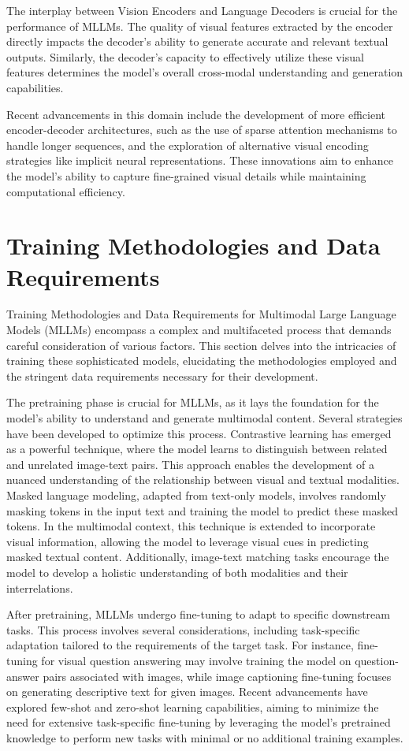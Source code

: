The interplay between Vision Encoders and Language Decoders is crucial for the performance of MLLMs. The quality of visual features extracted by the encoder directly impacts the decoder's ability to generate accurate and relevant textual outputs. Similarly, the decoder's capacity to effectively utilize these visual features determines the model's overall cross-modal understanding and generation capabilities.

Recent advancements in this domain include the development of more efficient encoder-decoder architectures, such as the use of sparse attention mechanisms to handle longer sequences, and the exploration of alternative visual encoding strategies like implicit neural representations. These innovations aim to enhance the model's ability to capture fine-grained visual details while maintaining computational efficiency.

\section{Training Methodologies and Data Requirements}
Training Methodologies and Data Requirements for Multimodal Large Language Models (MLLMs) encompass a complex and multifaceted process that demands careful consideration of various factors. This section delves into the intricacies of training these sophisticated models, elucidating the methodologies employed and the stringent data requirements necessary for their development.

The pretraining phase is crucial for MLLMs, as it lays the foundation for the model's ability to understand and generate multimodal content. Several strategies have been developed to optimize this process. Contrastive learning has emerged as a powerful technique, where the model learns to distinguish between related and unrelated image-text pairs. This approach enables the development of a nuanced understanding of the relationship between visual and textual modalities. Masked language modeling, adapted from text-only models, involves randomly masking tokens in the input text and training the model to predict these masked tokens. In the multimodal context, this technique is extended to incorporate visual information, allowing the model to leverage visual cues in predicting masked textual content. Additionally, image-text matching tasks encourage the model to develop a holistic understanding of both modalities and their interrelations.

After pretraining, MLLMs undergo fine-tuning to adapt to specific downstream tasks. This process involves several considerations, including task-specific adaptation tailored to the requirements of the target task. For instance, fine-tuning for visual question answering may involve training the model on question-answer pairs associated with images, while image captioning fine-tuning focuses on generating descriptive text for given images. Recent advancements have explored few-shot and zero-shot learning capabilities, aiming to minimize the need for extensive task-specific fine-tuning by leveraging the model's pretrained knowledge to perform new tasks with minimal or no additional training examples.


